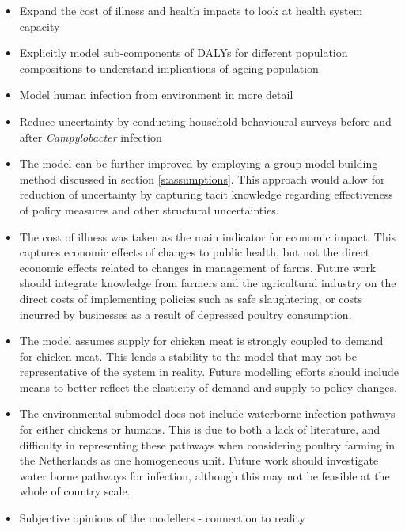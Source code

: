 \begin{itemize}
    \item Expand the cost of illness and health impacts to look at health system capacity
    \item Explicitly model sub-components of DALYs for different population compositions to understand implications of ageing population
    \item Model human infection from environment in more detail
    \item Reduce uncertainty by conducting household behavioural surveys before and after \textit{Campylobacter} infection
    \item The model can be further improved by employing a group model building method discussed in section \ref{s:assumptions}. This approach would allow for reduction of uncertainty by capturing tacit knowledge regarding effectiveness of policy measures and other structural uncertainties.
    \item The cost of illness was taken as the main indicator for economic impact. This captures economic effects of changes to public health, but not the direct economic effects related to changes in management of farms. Future work should integrate knowledge from farmers and the agricultural industry on the direct costs of implementing policies such as safe slaughtering, or costs incurred by businesses as a result of depressed poultry consumption.
    \item The model assumes supply for chicken meat is strongly coupled to demand for chicken meat. This lends a stability to the model that may not be representative of the system in reality. Future modelling efforts should include means to better reflect the elasticity of demand and supply to policy changes.
    \item The environmental submodel does not include waterborne infection pathways for either chickens or humans. This is due to both a lack of literature, and difficulty in representing these pathways when considering poultry farming in the Netherlands as one homogeneous unit. Future work should investigate water borne pathways for infection, although this may not be feasible at the whole of country scale. 
    \item Subjective opinions of the modellers - connection to reality
\end{itemize}

